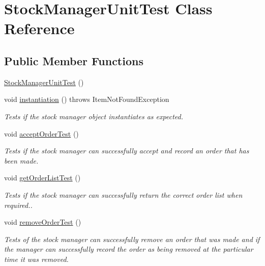 \hypertarget{class_stock_manager_unit_test}{\section{Stock\+Manager\+Unit\+Test Class Reference}
\label{class_stock_manager_unit_test}
}
\subsection*{Public Member Functions}
\begin{DoxyCompactItemize}
\item 
\hyperlink{class_stock_manager_unit_test_a6af0e746f02eeeb5d922f9a369fafd05}{Stock\+Manager\+Unit\+Test} ()
\item 
void \hyperlink{class_stock_manager_unit_test_a09745260d118ce6296964940ff0fcdb5}{instantiation} ()  throws Item\+Not\+Found\+Exception 
\begin{DoxyCompactList}\small\item\em Tests if the stock manager object instantiates as expected. \end{DoxyCompactList}\item 
void \hyperlink{class_stock_manager_unit_test_a528bc81dce5ad77cc63822b7f1df9409}{accept\+Order\+Test} ()
\begin{DoxyCompactList}\small\item\em Tests if the stock manager can successfully accept and record an order that has been made. \end{DoxyCompactList}\item 
void \hyperlink{class_stock_manager_unit_test_a2c655104c80c219c97e92d0c77f5de98}{get\+Order\+List\+Test} ()
\begin{DoxyCompactList}\small\item\em Tests if the stock manager can successfully return the correct order list when required.. \end{DoxyCompactList}\item 
void \hyperlink{class_stock_manager_unit_test_ab940be69c0fb11e9cf3f99f94a16a73a}{remove\+Order\+Test} ()
\begin{DoxyCompactList}\small\item\em Tests of the stock manager can successfully remove an order that was made and if the manager can successfully record the order as being removed at the particular time it was removed. \end{DoxyCompactList}\item 

\end{DoxyCompactItemize}
